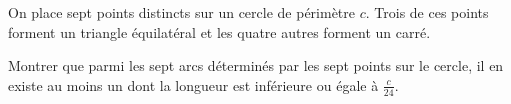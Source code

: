 \documentclass[varwidth]{standalone}
\begin{document}
    On place sept points distincts sur un cercle de p\'erim\`etre $c$. Trois de ces points forment un triangle \'equilat\'eral et les quatre autres forment un carr\'e.

    Montrer que parmi les sept arcs d\'etermin\'es par les sept points sur le cercle, il en existe au moins un dont la longueur est inf\'erieure ou \'egale \`a $\frac{c}{24}$.
\end{document}
